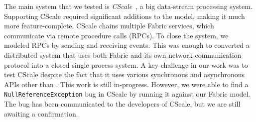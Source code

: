 
The main system that we tested is \emph{CScale}~\cite{faleiro2012},
a big data-stream processing system.
Supporting CScale required significant additions to the model, making it much more
feature-complete.
CScale chains multiple Fabric services, which communicate via remote procedure calls (RPCs).
To close the system, we modeled RPCs 
by sending and receiving \psharp{} events.
This was enough to converted a distributed system
that uses both Fabric and its own
network communication protocol
into 
a closed single process system. 
A key challenge in our work
was to test CScale despite the fact that it
uses various synchronous and asynchronous APIs
other than \psharp{}.
This work is still in-progress.
However, we were able to find a \texttt{NullReferenceException}
bug in CScale by running it against our Fabric model. The bug has been
communicated to the developers of CScale, but we are still awaiting a
confirmation.











